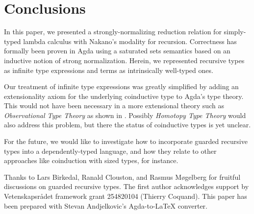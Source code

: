 
\section{Conclusions}
\label{sec:concl}

In this paper, we presented a strongly-normalizing reduction relation
for simply-typed lambda calculus with Nakano's modality for
recursion.  Correctness has formally been proven in Agda using a
saturated sets semantics based on an inductive notion of strong
normalization.  Herein, we represented recursive types as infinite
type expressions and terms as intrinsically well-typed ones.  

Our treatment of infinite type expressions was greatly simplified by
adding an extensionality axiom for the underlying coinductive type to
Agda's type theory.  This would not have been necessary in a more
extensional theory such as \emph{Observational Type Theory}
\citep{altenkirchMcBrideSwierstra:plpv07} as shown in \citep{mcBride:unfold}.  Possibly \emph{Homotopy Type
Theory} \citep{hott} 
would also address this problem, but there the status of
coinductive types is yet unclear.

For the future, we would like to investigate how to incorporate
guarded recursive types into a dependently-typed language, and how
they relate to other approaches like coinduction with sized
types, for instance.

Thanks to Lars Birkedal, Ranald Clouston, and Rasmus M\o{}gelberg for
fruitful discussions on guarded recursive types.
The first author acknowledges support by Vetenskapsr\aa{}det framework
grant 254820104 (Thierry Coquand).  This paper has been prepared with
Stevan Andjelkovic's Agda-to-LaTeX converter. 


